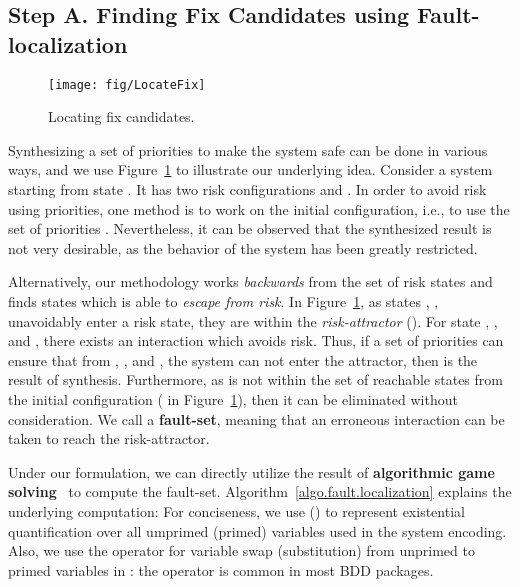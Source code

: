 \documentclass[10pt, a4paper, onecolumn, conference, compsocconf]{IEEEtran}
\begin{document}
\clearpage
\subsection{Step A. Finding Fix Candidates using Fault-localization\label{subsec.algo.prioritysyn.findingfix}} 
\begin{figure}[t]
\centering
 \texttt{[image: fig/LocateFix]}
  \caption{Locating fix candidates.}
 \label{fig:vissbip.locate.fix}
\end{figure}

Synthesizing a set of priorities to make the system safe can be done
in various ways, and we use Figure~\ref{fig:vissbip.locate.fix} to
illustrate our underlying idea. Consider a system starting from
state . It has two risk configurations  and . In
order to avoid risk using priorities, one method is to work on the
initial configuration, i.e., to use the set of priorities .
Nevertheless, it can be
observed that the synthesized result is not very desirable, as the
behavior of the system has been greatly restricted.

Alternatively, our methodology works \emph{backwards} from the set of risk states and finds states which is able to \emph{escape from risk}. In Figure~\ref{fig:vissbip.locate.fix}, as states , ,  unavoidably enter a risk state, they are within the \emph{risk-attractor} (). For state , , and , there exists an interaction which avoids risk. Thus, if a set of priorities  can ensure that from , , and , the system can not enter the attractor, then  is the result of synthesis. Furthermore, as  is not within the set of reachable states from the initial configuration ( in Figure~\ref{fig:vissbip.locate.fix}), then it can be eliminated without consideration. We call  a \textbf{fault-set}, meaning that an erroneous interaction can be taken to reach the risk-attractor.


Under our formulation, we can directly utilize the result of \textbf{algorithmic game solving}~\cite{gradel:2002:automata} to compute the
fault-set. Algorithm~\ref{algo.fault.localization} explains the underlying computation: For conciseness, we use  () to represent existential quantification over all umprimed (primed) variables used in the system encoding. Also, we use the operator  for variable swap (substitution) from unprimed to primed variables in : the  operator
is common in most BDD packages.
\end{document}
